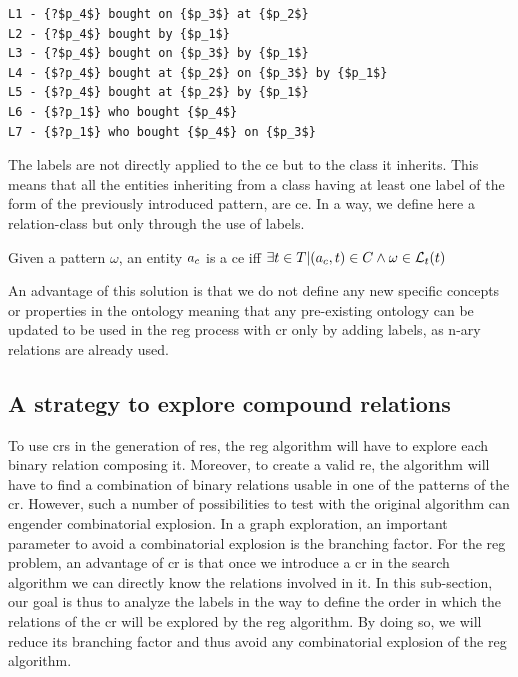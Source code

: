 \begin{lstlisting}[frame=single, caption={ A part of the label set of the purchase compound relation.}, label={lst:chap7_john_labels}, captionpos=b, style=Labels, mathescape=true]
L1 - {?$p_4$} bought on {$p_3$} at {$p_2$}
L2 - {?$p_4$} bought by {$p_1$}
L3 - {?$p_4$} bought on {$p_3$} by {$p_1$}
L4 - {$?p_4$} bought at {$p_2$} on {$p_3$} by {$p_1$}
L5 - {$?p_4$} bought at {$p_2$} by {$p_1$}
L6 - {$?p_1$} who bought {$p_4$}
L7 - {$?p_1$} who bought {$p_4$} on {$p_3$}
\end{lstlisting}

The labels are not directly applied to the \acrshort{ce} but to the class it inherits. This means that all the entities inheriting from a class having at least one label of the form of the previously introduced pattern, are \acrshort{ce}. In a way, we define here a relation-class but only through the use of labels.

\begin{theorem} 
\label{the:compound_entity}
Given a pattern $\omega$, an entity $a_c$ is a \acrlong{ce} iff $\exists t \in T | (a_c, t) \in C \land \omega \in \mathcal{L}_t{(t)}$
\end{theorem}

An advantage of this solution is that we do not define any new specific concepts or properties in the ontology meaning that any pre-existing ontology can be updated to be used in the \acrshort{reg} process with \acrshort{cr} only by adding labels, as n-ary relations are already used.

\subsection{A strategy to explore compound relations}

To use \acrlong{cr}s in the generation of \acrlong{re}s, the \acrshort{reg} algorithm will have to explore each binary relation composing it. Moreover, to create a valid \acrshort{re}, the algorithm will have to find a combination of binary relations usable in one of the patterns of the \acrshort{cr}. However, such a number of possibilities to test with the original algorithm can engender combinatorial explosion. In a graph exploration, an important parameter to avoid a combinatorial explosion is the branching factor. For the \acrshort{reg} problem, an advantage of \acrshort{cr} is that once we introduce a \acrshort{cr} in the search algorithm we can directly know the relations involved in it. In this sub-section, our goal is thus to analyze the labels in the way to define the order in which the relations of the \acrshort{cr} will be explored by the \acrshort{reg} algorithm. By doing so, we will reduce its branching factor and thus avoid any combinatorial explosion of the \acrshort{reg} algorithm.

